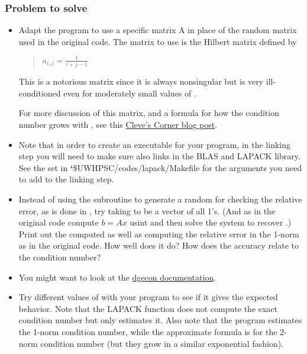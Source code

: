 \documentclass[letterpaper,10pt,english]{sphinxmanual}
\begin{document}
\subsubsection{Problem to solve}
\label{labs/lab16:problem-to-solve}\begin{itemize}
\item {} 
Adapt the program  to use a specific matrix A in place of
the random matrix used in the original code.  The matrix to use is the Hilbert matrix defined by
\begin{quote}

\(a_{i,j} = \frac{1}{i+j-1}\)
\end{quote}

This is a notorious matrix since it is always nonsingular but is very ill-conditioned even for
moderately small values of .

For more discussion of this matrix, and a formula for how the condition number grows with ,
see this \href{http://blogs.mathworks.com/cleve/2013/02/02/hilbert-matrices/\#73083b00-1b97-4570-a516-31796a031dc4}{Cleve's Corner blog post}.

\item {} 
Note that in order to create an executable for your program, in the linking step you will need
to make sure  also links in the BLAS and LAPACK library.  See the  set in
{\color{red}\bfseries{}{}`}\$UWHPSC/codes/lapack/Makefile for the arguments you need to add to the linking step.

\item {} 
Instead of using the  subroutine to generate a random  for checking the
relative error, as is done in , try taking  to be
a vector of all 1's.  (And as in the original code compute \(b = Ax\) usint  and
then solve the system to recover .)  Print out the computed  as well as computing the
relative error in the 1-norm as in the original code.  How well does it do?  How does the
accuracy relate to the condition number?

\item {} 
You might want to look at the \href{http://www.netlib.no/netlib/lapack/double/dgecon.f}{dgecon documentation}.

\item {} 
Try different values of  with your program to see if it gives the expected behavior.
Note that the LAPACK function  does not compute the exact condition number but only
estimates it.  Also note that the program estimates the 1-norm condition  number, while the
approximate formula is for the 2-norm condition number (but they grow in a similar exponential
fashion).

\end{itemize}
\end{document}
